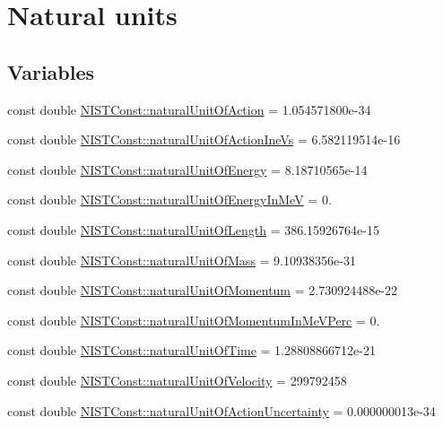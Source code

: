 \hypertarget{group___natural_unit}{}\section{Natural units}
\label{group___natural_unit}
\subsection*{Variables}
\begin{DoxyCompactItemize}
\item 
const double \hyperlink{group___natural_unit_ga6470eede777c792729aeb594d11b1005}{N\+I\+S\+T\+Const\+::natural\+Unit\+Of\+Action} = 1.\+054571800e-\/34
\item 
const double \hyperlink{group___natural_unit_gad129c66b980f820219b193de0daacbc6}{N\+I\+S\+T\+Const\+::natural\+Unit\+Of\+Action\+Ine\+Vs} = 6.\+582119514e-\/16
\item 
const double \hyperlink{group___natural_unit_ga8b044e82e055305f63f6f0a8255931b9}{N\+I\+S\+T\+Const\+::natural\+Unit\+Of\+Energy} = 8.\+18710565e-\/14
\item 
const double \hyperlink{group___natural_unit_ga2ff9cea4ca8c13fdefb9d89a71e892b2}{N\+I\+S\+T\+Const\+::natural\+Unit\+Of\+Energy\+In\+MeV} = 0.
\item 
const double \hyperlink{group___natural_unit_ga75fc809b9ed4ab1f3a49337cf66df772}{N\+I\+S\+T\+Const\+::natural\+Unit\+Of\+Length} = 386.\+15926764e-\/15
\item 
const double \hyperlink{group___natural_unit_ga0baa245921425da84c42fd881b7d1c0f}{N\+I\+S\+T\+Const\+::natural\+Unit\+Of\+Mass} = 9.\+10938356e-\/31
\item 
const double \hyperlink{group___natural_unit_ga88a54043ec0c3a9de3d8549836044045}{N\+I\+S\+T\+Const\+::natural\+Unit\+Of\+Momentum} = 2.\+730924488e-\/22
\item 
const double \hyperlink{group___natural_unit_ga4ac7dedeaf24fa9d4baa8331a85ab4ca}{N\+I\+S\+T\+Const\+::natural\+Unit\+Of\+Momentum\+In\+Me\+V\+Perc} = 0.
\item 
const double \hyperlink{group___natural_unit_ga20f1d962c5213c24d1350ee6a64e3a67}{N\+I\+S\+T\+Const\+::natural\+Unit\+Of\+Time} = 1.\+28808866712e-\/21
\item 
const double \hyperlink{group___natural_unit_ga4dcc4091af025cbd895e8bea1e265c32}{N\+I\+S\+T\+Const\+::natural\+Unit\+Of\+Velocity} = 299792458
\item 
const double \hyperlink{group___natural_unit_gab193769ac3b3bf95a370e30b186b0728}{N\+I\+S\+T\+Const\+::natural\+Unit\+Of\+Action\+Uncertainty} = 0.\+000000013e-\/34

\end{DoxyCompactItemize}
